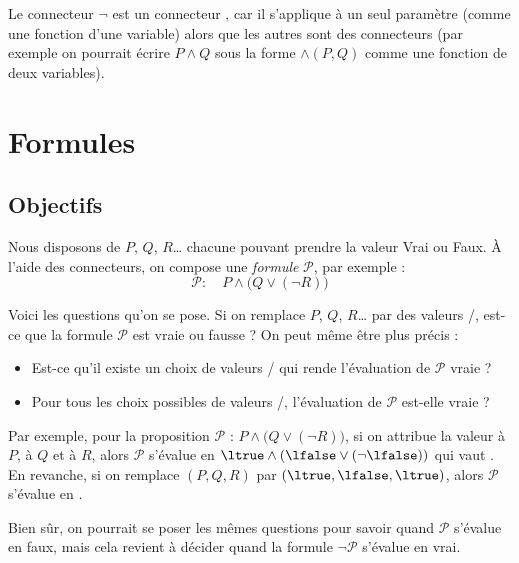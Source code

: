 \documentclass[11pt,class=report,crop=false]{standalone}
\begin{document}
Le connecteur $\lnot$ est un connecteur , car il s'applique à un seul paramètre (comme une fonction d'une variable) alors que les autres sont des connecteurs  (par exemple on pourrait écrire $P \land Q$ sous la forme $\land(P,Q)$ comme une fonction de deux variables).



\section{Formules}

\subsection{Objectifs}

Nous disposons de  $P$, $Q$, $R$\ldots{} chacune pouvant prendre la valeur Vrai ou Faux. À l'aide des connecteurs, on compose une \emph{formule} $\mathcal{P}$, par exemple :
\[
\mathcal{P} :  \quad P \land \big( Q \lor (\lnot R) \big)
\]

Voici les questions qu'on se pose.
Si on remplace $P$, $Q$, $R$\ldots{} par des valeurs \ltrue/\lfalse, est-ce que la formule $\mathcal{P}$ est vraie ou fausse ? On peut même être plus précis : 
\begin{itemize}
	\item Est-ce qu'il existe un choix de valeurs \ltrue/\lfalse{} qui rende l'évaluation de $\mathcal{P}$ vraie ?
	\item Pour tous les choix possibles de valeurs \ltrue/\lfalse, l'évaluation de $\mathcal{P}$ est-elle vraie ?
\end{itemize}


Par exemple, pour la proposition $\mathcal{P}$ : $P \land \big( Q \lor (\lnot R) \big)$, si on attribue la valeur \ltrue{} à $P$, \lfalse{} à $Q$ et \lfalse{} à $R$, alors $\mathcal{P}$ s'évalue en $\ltrue \land ( \lfalse \lor (\lnot \lfalse))$ qui vaut \ltrue.
En revanche, si on remplace $(P,Q,R)$ par $(\ltrue,\lfalse,\ltrue)$, alors $\mathcal{P}$ s'évalue en \lfalse.

Bien sûr, on pourrait se poser les mêmes questions pour savoir quand $\mathcal{P}$ s'évalue en faux, mais cela revient à décider quand la formule $\lnot \mathcal{P}$ s'évalue en vrai.
\end{document}
